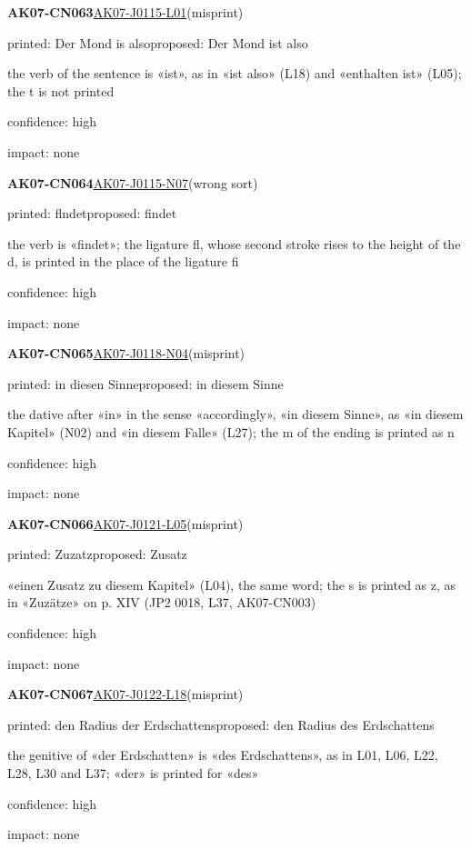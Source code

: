 \documentclass[11pt]{article}
\begin{document}
\noindent\textbf{AK07-CN063}\enspace\hyperlink{AK07-J0115-L01}{AK07-J0115-L01}\enspace(misprint)\par\noindent printed: Der Mond is also\enspace proposed: Der Mond ist also\par\noindent the verb of the sentence is «ist», as in «ist also» (L18) and «enthalten ist» (L05); the t is not printed\par\noindent confidence: high\par\noindent impact: none\par\medskip
\noindent\textbf{AK07-CN064}\enspace\hyperlink{AK07-J0115-N07}{AK07-J0115-N07}\enspace(wrong sort)\par\noindent printed: flndet\enspace proposed: findet\par\noindent the verb is «findet»; the ligature fl, whose second stroke rises to the height of the d, is printed in the place of the ligature fi\par\noindent confidence: high\par\noindent impact: none\par\medskip
\noindent\textbf{AK07-CN065}\enspace\hyperlink{AK07-J0118-N04}{AK07-J0118-N04}\enspace(misprint)\par\noindent printed: in diesen Sinne\enspace proposed: in diesem Sinne\par\noindent the dative after «in» in the sense «accordingly», «in diesem Sinne», as «in diesem Kapitel» (N02) and «in diesem Falle» (L27); the m of the ending is printed as n\par\noindent confidence: high\par\noindent impact: none\par\medskip
\noindent\textbf{AK07-CN066}\enspace\hyperlink{AK07-J0121-L05}{AK07-J0121-L05}\enspace(misprint)\par\noindent printed: Zuzatz\enspace proposed: Zusatz\par\noindent «einen Zusatz zu diesem Kapitel» (L04), the same word; the s is printed as z, as in «Zuzätze» on p. XIV (JP2 0018, L37, AK07-CN003)\par\noindent confidence: high\par\noindent impact: none\par\medskip
\noindent\textbf{AK07-CN067}\enspace\hyperlink{AK07-J0122-L18}{AK07-J0122-L18}\enspace(misprint)\par\noindent printed: den Radius der Erdschattens\enspace proposed: den Radius des Erdschattens\par\noindent the genitive of «der Erdschatten» is «des Erdschattens», as in L01, L06, L22, L28, L30 and L37; «der» is printed for «des»\par\noindent confidence: high\par\noindent impact: none\par\medskip
\end{document}
